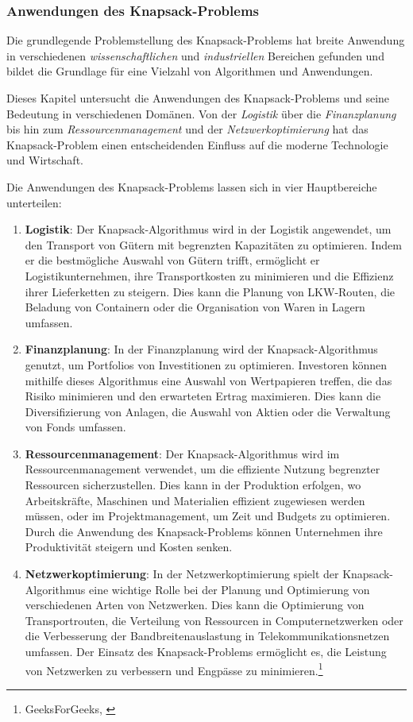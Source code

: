 \subsubsection{Anwendungen des Knapsack-Problems}
Die grundlegende Problemstellung des Knapsack-Problems hat breite Anwendung in verschiedenen \textit{wissenschaftlichen}
und \textit{industriellen} Bereichen gefunden und bildet die Grundlage für eine Vielzahl von Algorithmen und Anwendungen.

Dieses Kapitel untersucht die Anwendungen des Knapsack-Problems und seine Bedeutung in verschiedenen Domänen. Von der
\textit{Logistik} über die \textit{Finanzplanung} bis hin zum \textit{Ressourcenmanagement} und der \textit{Netzwerkoptimierung}
hat das Knapsack-Problem einen entscheidenden Einfluss auf die moderne Technologie und Wirtschaft.

Die Anwendungen des Knapsack-Problems lassen sich in vier Hauptbereiche unterteilen:
\begin{enumerate}
\item \textbf{Logistik}: Der Knapsack-Algorithmus wird in der Logistik angewendet, um den Transport von Gütern mit
begrenzten Kapazitäten zu optimieren. Indem er die bestmögliche Auswahl von Gütern trifft, ermöglicht er Logistikunternehmen,
ihre Transportkosten zu minimieren und die Effizienz ihrer Lieferketten zu steigern. Dies kann die Planung von LKW-Routen,
die Beladung von Containern oder die Organisation von Waren in Lagern umfassen.
\item \textbf{Finanzplanung}: In der Finanzplanung wird der Knapsack-Algorithmus genutzt, um Portfolios von Investitionen
zu optimieren. Investoren können mithilfe dieses Algorithmus eine Auswahl von Wertpapieren treffen, die das Risiko
minimieren und den erwarteten Ertrag maximieren. Dies kann die Diversifizierung von Anlagen, die Auswahl von Aktien
oder die Verwaltung von Fonds umfassen.
\item \textbf{Ressourcenmanagement}: Der Knapsack-Algorithmus wird im Ressourcenmanagement verwendet, um die effiziente
Nutzung begrenzter Ressourcen sicherzustellen. Dies kann in der Produktion erfolgen, wo Arbeitskräfte, Maschinen und
Materialien effizient zugewiesen werden müssen, oder im Projektmanagement, um Zeit und Budgets zu optimieren. Durch
die Anwendung des Knapsack-Problems können Unternehmen ihre Produktivität steigern und Kosten senken.
\item \textbf{Netzwerkoptimierung}: In der Netzwerkoptimierung spielt der Knapsack-Algorithmus eine wichtige Rolle
bei der Planung und Optimierung von verschiedenen Arten von Netzwerken. Dies kann die Optimierung von Transportrouten,
die Verteilung von Ressourcen in Computernetzwerken oder die Verbesserung der Bandbreitenauslastung in Telekommunikationsnetzen
umfassen. Der Einsatz des Knapsack-Problems ermöglicht es, die Leistung von Netzwerken zu verbessern und Engpässe zu
minimieren.\footnote{GeeksForGeeks, \cite{Introduction to Knapsack Problem, its Types and How to solve them}}
\end{enumerate}


